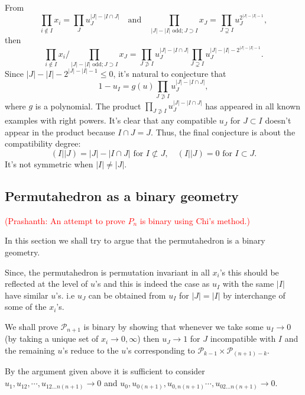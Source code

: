 \documentclass[hidelinks,12pt]{article}
\begin{document}
From
\[
\prod_{i\not\in I}x_i=\prod_J u_J^{|J|-|I\cap J|}
\quad\text{and}\quad
\prod_{|J|-|I| \text{ odd}; J\supset I}x_J
=
\prod_{J\supsetneq I}u_J^{2^{|J|-|I|-1}},
\]
then
\[
\prod_{i\not\in I}x_i\bigg/\prod_{|J|-|I| \text{ odd}; J\supset I}x_J
=\prod_{J\not\supset I} u_J^{|J|-|I\cap J|}\prod_{J\supsetneq I} u_J^{|J|-|I|-2^{|J|-|I|-1}}.
\]
Since $|J|-|I|-2^{|J|-|I|-1}\leq 0$, it's natural to conjecture that
\begin{equation}
1-u_I=g(u)\prod_{J\not\supset I} u_J^{|J|-|I\cap J|},
\end{equation}
where $g$ is a polynomial.
The product $\prod_{J\not\supset I} u_J^{|J|-|I\cap J|}$ has appeared in all known examples with right powers. It's clear that any compatible $u_J$ for $J\subset I$ doesn't appear in the product because $I\cap J=J$. Thus, the final conjecture is about the compatibility degree:
\[
(I||J)=|J|-|I\cap J|\text{ for $I\not\subset J$},\quad  (I||J)=0 \text{ for $I\subset J$}.
\]
It's not symmetric when $|I|\neq |J|$.


\subsection{Permutahedron as a binary geometry}

\textcolor{red}{(Prashanth: An attempt to prove $P_n$ is binary using Chi's method.)}

In this section we shall try to argue that the permutahedron is a binary geometry.

Since, the permutahedron is permutation invariant in all $x_i$'s this should be reflected at the level of $u$'s and this is indeed the case as $u_I$ with the same $|I|$ have similar $u$'s. i.e $u_J$ can be obtained from $u_I$ for $|J|=|I|$ by interchange of some of the $x_i$'s.

We shall prove $\mathscr P_{n+1}$ is binary by showing that whenever we take some $u_I \rightarrow 0$ (by taking a unique set of $x_i \rightarrow 0, \infty$) then $u_J \rightarrow 1$ for $J$ incompatible with $I$ and the remaining $u$'s reduce to the $u$'s corresponding to $\mathscr P_{k-1} \times \mathscr P_{(n+1)-k}$. 

By the argument given above it is sufficient to consider $u_1, u_{12},\cdots,u_{12...n(n+1)} \rightarrow 0$ and $u_0, u_{0(n+1)},u_{0,n(n+1)}\cdots,u_{02...n(n+1)} \rightarrow 0$.
\end{document}
